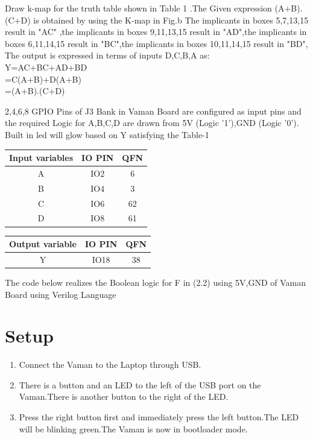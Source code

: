 \documentclass[10pt, a4paper]{article}
\begin{document}
Draw k-map for  the truth table shown in Table 1 .The Given expression  (A+B).(C+D) is obtained by  using the K-map in Fig.b 
The implicants in boxes 5,7,13,15 result in "AC" ,the implicants in boxes 9,11,13,15 result in "AD",the implicants in boxes 6,11,14,15 result in "BC",the implicants in boxes 10,11,14,15 result in "BD",
\\The output is expressed in terms of inputs D,C,B,A as: 
\\Y=AC+BC+AD+BD
\\ =C(A+B)+D(A+B)
\\ =(A+B).(C+D)


2,4,6,8 GPIO Pins of J3 Bank in Vaman Board are configured as input pins and the required Logic for A,B,C,D are drawn from 5V (Logic '1'),GND (Logic '0'). Built in led will glow based on Y satisfying the Table-1\\

\begin{center}
\begin{tabular}{|c|c|c|}
\hline
\textbf{Input variables}&\textbf{IO PIN}&\textbf{QFN}\\
\hline
A & IO2&6\\  
\hline
B & IO4 &3\\ 
\hline
C & IO6 &62\\
\hline
D & IO8 &61\\
\hline
\end{tabular}
\end{center}
\begin{center}
\begin{tabular}{|c|c|c|}
\hline
\textbf{Output variable}&\textbf{IO PIN}&\textbf{QFN}\\
\hline
Y & IO18 &38\\  
\hline
\end{tabular}
\end{center}
The code below realizes the Boolean logic for F in (2.2)  using 5V,GND of Vaman Board using Verilog Language
\begin{center}
\end{center}
  
\section{Setup}
\begin{enumerate}
\item Connect the Vaman to the Laptop through USB.
\item There is a button and an LED to the left of the USB port on the Vaman.There is another button to the right of the LED.
\item Press the right button first and immediately press the left button.The LED will be blinking green.The Vaman is now in bootloader mode.
\end{enumerate}
\end{document}
